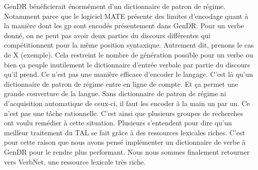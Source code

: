 GenDR bénéficierait énormément d'un dictionnaire de patron de régime. Notamment parce que le logiciel MATE présente des limites d'encodage quant à la manière dont les gp sont encodés présentement dans GenDR. Pour un verbe donné, on ne peut pas avoir deux parties du discours différentes qui compétitionnent pour la même position syntaxique. Autrement dit, prenons le cas de X (exemple). Cela restreint le nombre de génération possible pour un verbe ou bien ça peuple inutilement le dictionnaire d'entrée verbale par partie du discours qu'il prend. Ce n'est pas une manière efficace d'encoder le langage. C'est là qu'un dictionnaire de patron de régime entre en ligne de compte. Et ça permet une grande couverture de la langue. Sans dictionnaire de patron de régime ni d'acquisition automatique de ceux-ci, il faut les encoder à la main un par un. Ce n'est pas une tâche rationnelle. C'est ainsi que plusieurs groupes de recherches ont voulu remédier à cette situation. Plusieurs s'entendent pour dire qu'un meilleur traitement du \ac{TAL} se fait grâce à des ressources lexicales riches. C'est pour cette raison que nous avons pensé implémenter un dictionnaire de verbe à GenDR pour le rendre plus performant. Nous nous sommes finalement retourner vers VerbNet, une ressource lexicale très riche.